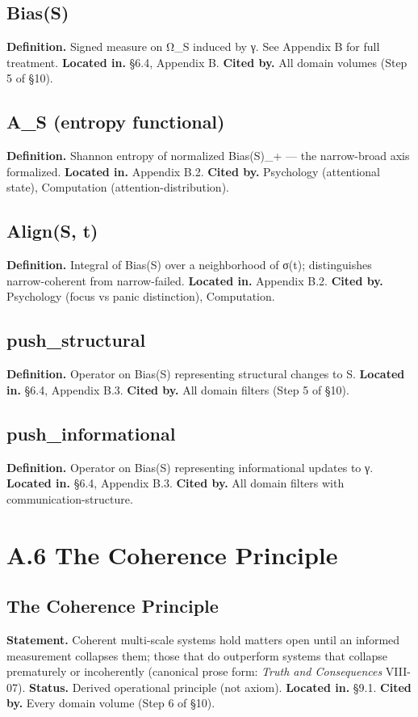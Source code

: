 \documentclass[11pt, openany]{book}
\newcommand{\sectionbreak}{\clearpage}
\begin{document}
\subsection{Bias(S)}
\textbf{Definition.} Signed measure on Ω\_\allowbreak{}S induced by γ. See Appendix B for full treatment.
\textbf{Located in.} §6.4, Appendix B.
\textbf{Cited by.} All domain volumes (Step 5 of §10).

\subsection{A\_\allowbreak{}S (entropy functional)}
\textbf{Definition.} Shannon entropy of normalized Bias(S)\_\allowbreak{}+ --- the narrow-broad axis formalized.
\textbf{Located in.} Appendix B.2.
\textbf{Cited by.} Psychology (attentional state), Computation (attention-distribution).

\subsection{Align(S, t)}
\textbf{Definition.} Integral of Bias(S) over a neighborhood of σ(t); distinguishes narrow-coherent from narrow-failed.
\textbf{Located in.} Appendix B.2.
\textbf{Cited by.} Psychology (focus vs panic distinction), Computation.

\subsection{push\_\allowbreak{}structural}
\textbf{Definition.} Operator on Bias(S) representing structural changes to S.
\textbf{Located in.} §6.4, Appendix B.3.
\textbf{Cited by.} All domain filters (Step 5 of §10).

\subsection{push\_\allowbreak{}informational}
\textbf{Definition.} Operator on Bias(S) representing informational updates to γ.
\textbf{Located in.} §6.4, Appendix B.3.
\textbf{Cited by.} All domain filters with communication-structure.

\sectionbreak

\section{A.6 The Coherence Principle}

\subsection{The Coherence Principle}
\textbf{Statement.} Coherent multi-scale systems hold matters open until an informed measurement collapses them; those that do outperform systems that collapse prematurely or incoherently (canonical prose form: \textit{Truth and Consequences} VIII-07).
\textbf{Status.} Derived operational principle (not axiom).
\textbf{Located in.} §9.1.
\textbf{Cited by.} Every domain volume (Step 6 of §10).
\end{document}
